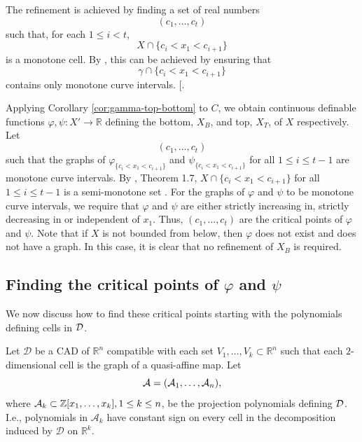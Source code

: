 \documentclass[
]{book}
\theoremstyle{definition}
\theoremstyle{definition}
\theoremstyle{definition}
\theoremstyle{definition}
\theoremstyle{remark}
\begin{document}
The refinement is achieved by finding a set of real numbers
\[
(c_1,\ldots,c_t)
\]
such that, for each \(1 \le i < t\),
\[
X \cap \{c_i < x_1 < c_{i+1}\}
\]
is a monotone cell. By \citep[Theorem 1.7]{bgv13}, this can be achieved by ensuring that
\[
\gamma \cap \{ c_i < x_1 < c_{i+1}\}
\]
contains only monotone curve intervals. {[}\citet[Theorem 3.18]{bgv15}.

Applying Corollary \ref{cor:gamma-top-bottom} to \(C\), we obtain continuous definable functions \(\varphi,\psi : X' \to \mathbb{R}\) defining the bottom, \(X_B\), and top, \(X_T\), of \(X\) respectively.
Let \[
(c_1,\ldots,c_t)
\]
such that the graphs of \(\varphi_{\{ c_i < x_1 < c_{i+1} \}}\) and \(\psi_{\{ c_i < x_1 < c_{i+1} \}}\) for all \(1 \le i \le t-1\) are monotone curve intervals. By \citet{bgv15}, Theorem 1.7, \(X \cap \{ c_i < x_1 < c_{i+1} \}\) for all \(1\le i \le t-1\) is a semi-monotone set \citep[proof of Lemma 3.18]{bgv15}.
For the graphs of \(\varphi\) and \(\psi\) to be monotone curve intervals, we require that \(\varphi\) and \(\psi\) are either strictly increasing in, strictly decreasing in or independent of \(x_1\). Thus, \((c_1,\ldots,c_t)\) are the critical points of \(\varphi\) and \(\psi\).
Note that if \(X\) is not bounded from below, then \(\varphi\) does not exist and does not have a graph.
In this case, it is clear that no refinement of \(X_B\) is required.

\hypertarget{sec:lagrange-refinement}{%
\subsection{\texorpdfstring{Finding the critical points of \(\varphi\) and \(\psi\)}{Finding the critical points of \textbackslash varphi and \textbackslash psi}}\label{sec:lagrange-refinement}}

We now discuss how to find these critical points starting with the polynomials defining cells in \(\cal D\).

Let \(\mathcal{D}\) be a CAD of \(\mathbb{R}^n\) compatible with each set \(V_1,\ldots,V_k \subset \mathbb{R}^n\) such that each \(2\)-dimensional cell is the graph of a quasi-affine map. Let
\begin{equation}
{\cal A} = ({\cal A}_1,\ldots,{\cal A}_n),
\label{eq:proj-fac-set}
\end{equation}
where \({\cal A}_k \subset \mathbb{Z}[x_1,\ldots,x_k], 1 \le k \le n\), be the projection polynomials defining \(\cal D\).
I.e., polynomials in \(\mathcal{A}_k\) have constant sign on every cell in the decomposition induced by \(\mathcal{D}\) on \(\mathbb{R}^k\).
\end{document}
